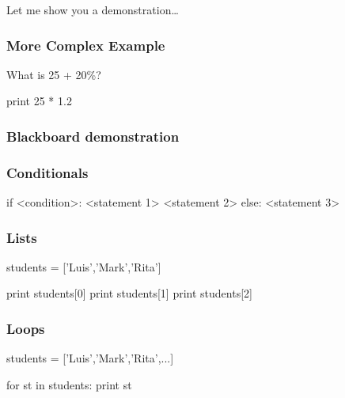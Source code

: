\begin{frame}[fragile]

\bigskip
\bigskip
\bigskip
Let me show you a demonstration\ldots



\end{frame}

\begin{frame}[fragile]
\frametitle{More Complex Example}

What is 25 + 20\%?

\pause
\begin{python}
print 25 * 1.2
\end{python}
\end{frame}

\begin{frame}[fragile]
\frametitle{Blackboard demonstration}

\end{frame}

\begin{frame}[fragile]
\frametitle{Conditionals}

\begin{python}

if <condition>:
    <statement 1>
    <statement 2>
else:
    <statement 3>

\end{python}
\end{frame}

\begin{frame}[fragile]
\frametitle{Lists}

\begin{python}

students = ['Luis','Mark','Rita']

print students[0]
print students[1]
print students[2]
\end{python}

\end{frame}

\begin{frame}[fragile]
\frametitle{Loops}

\begin{python}
students = ['Luis','Mark','Rita',...]

for st in students:
    print st
\end{python}
\end{frame}

